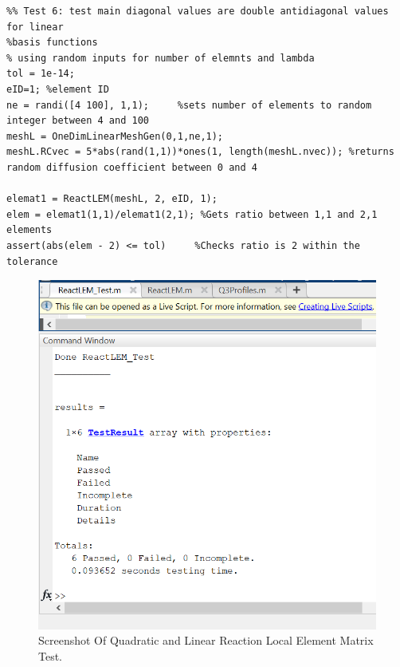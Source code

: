 \documentclass[11pt]{article}
\begin{document}
\begin{appendices}
\begin{lstlisting}
%% Test 6: test main diagonal values are double antidiagonal values for linear
%basis functions
% using random inputs for number of elemnts and lambda
tol = 1e-14;
eID=1; %element ID
ne = randi([4 100], 1,1);     %sets number of elements to random integer between 4 and 100
meshL = OneDimLinearMeshGen(0,1,ne,1);
meshL.RCvec = 5*abs(rand(1,1))*ones(1, length(meshL.nvec)); %returns random diffusion coefficient between 0 and 4

elemat1 = ReactLEM(meshL, 2, eID, 1);
elem = elemat1(1,1)/elemat1(2,1); %Gets ratio between 1,1 and 2,1 elements
assert(abs(elem - 2) <= tol)     %Checks ratio is 2 within the tolerance

 \end{lstlisting}

\begin{figure}[ht]  %
	\centering
	\includegraphics[width=.8\textwidth]{ReactTest.png}
    \caption{Screenshot Of Quadratic and Linear Reaction Local Element Matrix Test.}\label{fig:ReactTest}
\end{figure}


\end{appendices}
\end{document}
